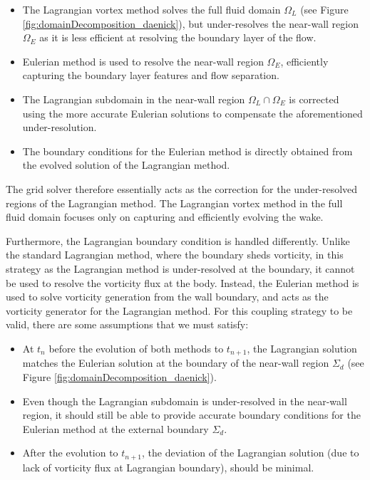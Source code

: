 	\begin{itemize}
	\item The Lagrangian vortex method solves the full fluid domain $\Omega_L$ (see Figure \ref{fig:domainDecomposition_daenick}), but under-resolves the near-wall region $\Omega_E$ as it is less efficient at resolving the boundary layer of the flow.
	
	\item Eulerian method is used to resolve the near-wall region $\Omega_E$, efficiently capturing the boundary layer features and flow separation.
	
	\item The Lagrangian subdomain in the near-wall region $\Omega_L\cap\Omega_E$ is corrected using the more accurate Eulerian solutions to compensate the aforementioned under-resolution.
	
	\item The boundary conditions for the Eulerian method is directly obtained from the evolved solution of the Lagrangian method.
	\end{itemize}
	
	The grid solver therefore essentially acts as the correction for the under-resolved regions of the Lagrangian method. The Lagrangian vortex method in the full fluid domain focuses only on capturing and efficiently evolving the wake.
	
	Furthermore, the Lagrangian boundary condition is handled differently. Unlike the standard Lagrangian method, where the boundary sheds vorticity, in this strategy as the Lagrangian method is under-resolved at the boundary, it cannot be used to resolve the vorticity flux at the body. Instead, the Eulerian method is used to solve vorticity generation from the wall boundary, and acts as the vorticity generator for the Lagrangian method. For this coupling strategy to be valid, there are some assumptions that we must satisfy:

	\begin{itemize}
	\item At $t_n$ before the evolution of both methods to $t_{n+1}$, the Lagrangian solution matches the Eulerian solution at the boundary of the near-wall region $\Sigma_d$ (see Figure \ref{fig:domainDecomposition_daenick}).
	\item Even though the Lagrangian subdomain is under-resolved in the near-wall region, it should still be able to provide accurate boundary conditions for the Eulerian method at the external boundary $\Sigma_d$.
	\item After the evolution to $t_{n+1}$, the deviation of the Lagrangian solution (due to lack of vorticity flux at Lagrangian boundary), should be minimal.
	\end{itemize}	
	
